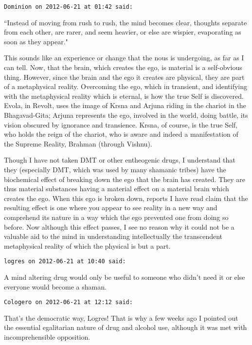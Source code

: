 \begin{footnotesize}\begin{sffamily}



\texttt{Dominion on 2012-06-21 at 01:42 said: }

``Instead of moving from rush to rush, the mind becomes clear, thoughts separate from each other, are rarer, and seem heavier, or else are wispier, evaporating as soon as they appear."

This sounds like an experience or change that the nous is undergoing, as far as I can tell. Now, that the brain, which creates the ego, is material is a self-obvious thing. However, since the brain and the ego it creates are physical, they are part of a metaphysical reality. Overcoming the ego, which in transient, and identifying with the metaphysical reality which is eternal, is how the true Self is discovered. Evola, in Revolt, uses the image of Krsna and Arjuna riding in the chariot in the Bhagavad-Gita; Arjuna represents the ego, involved in the world, doing battle, its vision obscured by ignorance and transience. Krsna, of course, is the true Self, who holds the reign of the chariot, who is aware and indeed a manifestation of the Supreme Reality, Brahman (through Vishnu). 

Though I have not taken DMT or other entheogenic drugs, I understand that they (especially DMT, which was used by many shamanic tribes) have the biochemical effect of breaking down the ego that the brain has created. They are thus material substances having a material effect on a material brain which creates the ego. When this ego is broken down, reports I have read claim that the resulting effect is one where you appear to see reality in a new way and comprehend its nature in a way which the ego prevented one from doing so before. Now although this effect passes, I see no reason why it could not be a valuable aid to the mind in understanding intellectually the transcendent metaphysical reality of which the physical is but a part.


\hfill

\texttt{logres on 2012-06-21 at 10:40 said: }

A mind altering drug would only be useful to someone who didn't need it or else everyone would become a shaman.


\hfill

\texttt{Cologero on 2012-06-21 at 12:12 said: }

That's the democratic way, Logres! That is why a few weeks ago I pointed out the essential egalitarian nature of drug and alcohol use, although it was met with incomprehensible opposition.



\end{sffamily}
\end{footnotesize}
